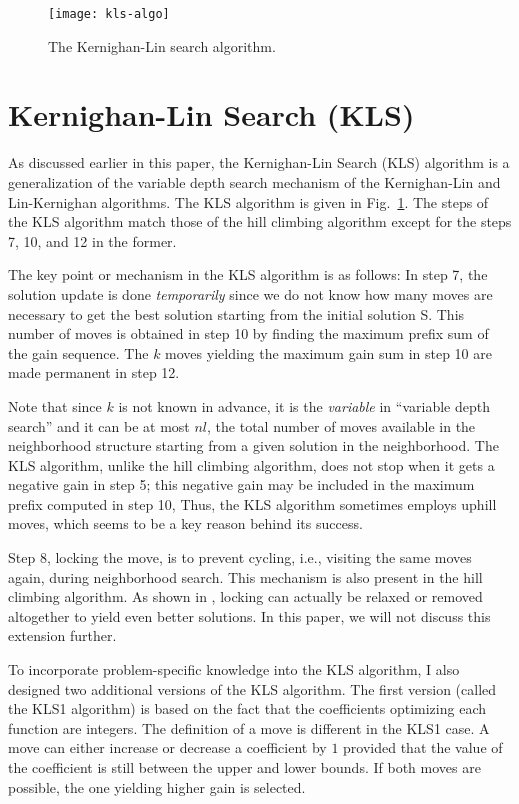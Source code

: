 \documentclass{article}
\begin{document}
\begin{figure}[t]
  \centering
  \texttt{[image: kls-algo]}
  \caption{The Kernighan-Lin search algorithm.}
  \label{fig:kls-algo}
\end{figure}

\section{Kernighan-Lin Search (KLS)}
\label{sec:kls-algo}

As discussed earlier in this paper, the Kernighan-Lin Search (KLS)
algorithm is a generalization of the variable depth search mechanism
of the Kernighan-Lin and Lin-Kernighan algorithms. The KLS algorithm
is given in Fig.~\ref{fig:kls-algo}. The steps of the KLS algorithm
match those of the hill climbing algorithm except for the steps 7, 10,
and 12 in the former.

The key point or mechanism in the KLS algorithm is as follows: In step
7, the solution update is done {\em temporarily} since we do not know
how many moves are necessary to get the best solution starting from
the initial solution S. This number of moves is obtained in step 10 by
finding the maximum prefix sum of the gain sequence. The $k$ moves
yielding the maximum gain sum in step 10 are made permanent in step
12.

Note that since $k$ is not known in advance, it is the {\em variable}
in ``variable depth search'' and it can be at most $nl$, the total
number of moves available in the neighborhood structure starting from
a given solution in the neighborhood. The KLS algorithm, unlike the
hill climbing algorithm, does not stop when it gets a negative gain in
step 5; this negative gain may be included in the maximum prefix
computed in step 10, Thus, the KLS algorithm sometimes employs uphill
moves, which seems to be a key reason behind its success.

Step 8, locking the move, is to prevent cycling, i.e., visiting the
same moves again, during neighborhood search. This mechanism is also
present in the hill climbing algorithm. As shown in \cite{DaAy97},
locking can actually be relaxed or removed altogether to yield even
better solutions. In this paper, we will not discuss this extension
further.

To incorporate problem-specific knowledge into the KLS algorithm, I
also designed two additional versions of the KLS algorithm. The first
version (called the KLS1 algorithm) is based on the fact that the
coefficients optimizing each function are integers. The definition of
a move is different in the KLS1 case. A move can either increase or
decrease a coefficient by $1$ provided that the value of the
coefficient is still between the upper and lower bounds. If both moves
are possible, the one yielding higher gain is selected.
\end{document}

